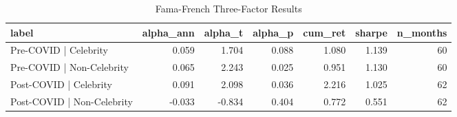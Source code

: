 \begin{table}[ht]
\centering
\caption{Fama-French Three-Factor Results}
\label{tab:ff3}
\begin{tabular}{lrrrrrr}
\toprule
\textbf{label} & \textbf{alpha_ann} & \textbf{alpha_t} & \textbf{alpha_p} & \textbf{cum_ret} & \textbf{sharpe} & \textbf{n_months} \\
\midrule
Pre-COVID | Celebrity & 0.059 & 1.704 & 0.088 & 1.080 & 1.139 & 60 \\
Pre-COVID | Non-Celebrity & 0.065 & 2.243 & 0.025 & 0.951 & 1.130 & 60 \\
Post-COVID | Celebrity & 0.091 & 2.098 & 0.036 & 2.216 & 1.025 & 62 \\
Post-COVID | Non-Celebrity & -0.033 & -0.834 & 0.404 & 0.772 & 0.551 & 62 \\
\bottomrule
\end{tabular}
\end{table}